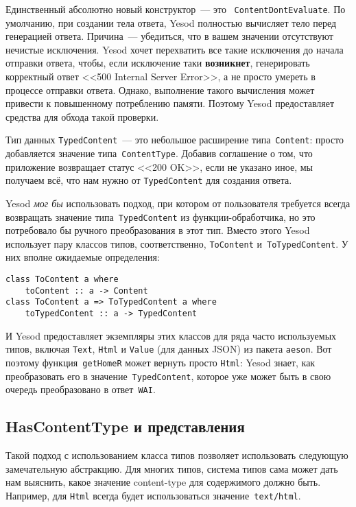 Единственный абсолютно новый конструктор~--- это
~\lstinline'ContentDontEvaluate'. По умолчанию, при создании тела ответа, Yesod
полностью вычисляет тело перед генерацией ответа. Причина~--- убедиться, что в
вашем значении отсутствуют нечистые исключения. Yesod хочет перехватить все
такие исключения до начала отправки ответа, чтобы, если исключение таки
\textbf{возникнет}, генерировать корректный ответ <<500 Internal Server
Error>>, а не просто умереть в процессе отправки ответа. Однако, выполнение
такого вычисления может привести к повышенному потреблению памяти. Поэтому
Yesod предоставляет средства для обхода такой проверки.

Тип данных \lstinline'TypedContent'~--- это небольшое расширение
типа~\lstinline'Content': просто добавляется значение
типа~\lstinline'ContentType'. Добавив соглашение о том, что приложение
возвращает статус <<200 OK>>, если не указано иное, мы получаем всё, что нам
нужно от \lstinline'TypedContent' для создания ответа.

Yesod \emph{мог бы} использовать подход, при котором от пользователя требуется
всегда возвращать значение типа~\lstinline'TypedContent' из
функции-обработчика, но это потребовало бы ручного преобразования в этот тип.
Вместо этого Yesod использует пару классов типов, соответственно,
\lstinline'ToContent' и~\lstinline'ToTypedContent'. У них вполне ожидаемые
определения:
\begin{lstlisting}
class ToContent a where
    toContent :: a -> Content
class ToContent a => ToTypedContent a where
    toTypedContent :: a -> TypedContent
\end{lstlisting}

И Yesod предоставляет экземпляры этих классов для ряда часто используемых
типов, включая \lstinline'Text', \lstinline'Html' и
\lstinline'Value' (для данных JSON) из пакета \texttt{aeson}. Вот поэтому
функция~\lstinline'getHomeR' может вернуть просто \lstinline'Html': Yesod
знает, как преобразовать его в значение~\lstinline'TypedContent', которое уже
может быть в свою очередь преобразовано в ответ~\lstinline'WAI'.

\subsection{HasContentType и представления}
Такой подход с использованием класса типов позволяет использовать следующую
замечательную абстракцию. Для многих типов, система типов сама может дать
нам выяснить, какое значение content-type для содержимого должно быть.
Например, для \lstinline'Html' всегда будет использоваться
значение~\lstinline'text/html'.

